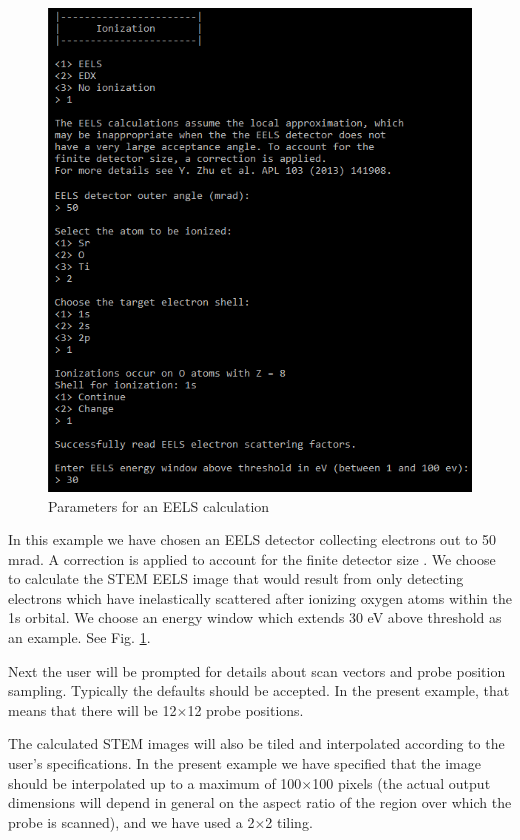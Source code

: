 \documentclass[12pt,a4paper]{article}
\newcommand{\by}{$\times$}
\begin{document}
\begin{figure}[!h]
\begin{center}
    \includegraphics[scale=0.75]{cb_abs_EELS.png}
\caption{Parameters for an EELS calculation}
\label{fig:cb_abs_EELS}
\end{center}
\end{figure}

In this example we have chosen an EELS detector collecting electrons out to 50 mrad.
A correction is applied to account for the finite detector size \cite{Zhu2013}.
We choose to calculate the STEM EELS image that would result from only detecting electrons which have inelastically scattered after ionizing oxygen atoms within the 1s orbital.
We choose an energy window which extends 30 eV above threshold as an example.
See Fig. \ref{fig:cb_abs_EELS}.

Next the user will be prompted for details about scan vectors and probe position sampling.
Typically the defaults should be accepted.
In the present example, that means that there will be 12\by12 probe positions.

The calculated STEM images will also be tiled and interpolated according to the user's specifications.
In the present example we have specified that the image should be interpolated up to a maximum of 100\by100 pixels (the actual output dimensions will depend in general on the aspect ratio of the region over which the probe is scanned), and we have used a 2\by2 tiling.
\end{document}
